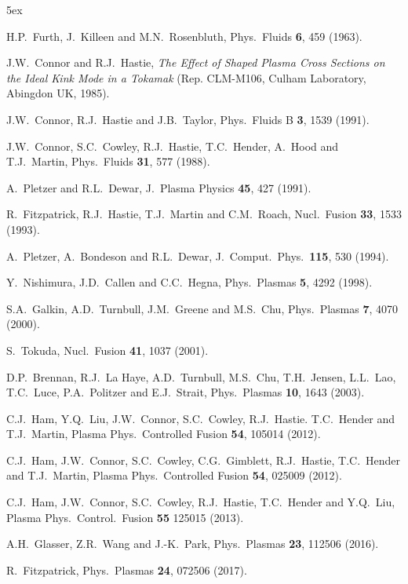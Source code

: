 \documentclass[12pt,prb,aps]{revtex4-1}
\begin{document}
\begin{thebibliography}{99}\baselineskip 5ex

 H.P.~Furth,  J.~Killeen and M.N.~Rosenbluth,  Phys.\ Fluids {\bf 6}, 459 (1963).

 J.W.~Connor and R.J.~Hastie, {\em The Effect of Shaped Plasma Cross Sections on the Ideal Kink Mode in a Tokamak}\/ (Rep. CLM-M106, Culham Laboratory, Abingdon UK, 1985).

 J.W.~Connor, R.J.~Hastie and J.B.~Taylor, Phys.\ Fluids B {\bf 3}, 1539 (1991).

 J.W.~Connor,  S.C.~Cowley, R.J.~Hastie,  T.C.~Hender,  A.~Hood  and T.J.~Martin,  Phys.\ Fluids {\bf 31}, 577 (1988).

 A.~Pletzer and R.L.~Dewar, J.\ Plasma Physics {\bf 45}, 427 (1991).

 R.~Fitzpatrick, R.J.~Hastie, T.J.~Martin and C.M.~Roach, Nucl.\ Fusion {\bf 33}, 1533 (1993).

  A.~Pletzer, A.~Bondeson and R.L.~Dewar, J.\ Comput.\ Phys.\ {\bf 115}, 530 (1994).

 Y.~Nishimura, J.D.~Callen and C.C.~Hegna, Phys.\ Plasmas {\bf 5}, 4292 (1998).

 S.A.~Galkin, A.D.~Turnbull, J.M.~Greene and M.S.~Chu, Phys.\ Plasmas {\bf 7}, 4070 (2000). 

 S.~Tokuda, Nucl.\ Fusion {\bf 41}, 1037 (2001).

 D.P.~Brennan, R.J.~La Haye, A.D.~Turnbull, M.S.~Chu, T.H.~Jensen, L.L.~Lao, T.C.~Luce, P.A.~Politzer and E.J.~Strait, Phys.\ Plasmas {\bf 10}, 1643 (2003).

  C.J.~Ham, Y.Q.~Liu, J.W.~Connor, S.C.~Cowley, R.J.~Hastie. T.C.~Hender and T.J.~Martin, Plasma Phys.\ Controlled Fusion {\bf 54}, 105014 (2012). 

 C.J.~Ham, J.W.~Connor, S.C.~Cowley, C.G.~Gimblett, R.J.~Hastie, T.C.~Hender and T.J.~Martin, Plasma Phys.\ Controlled Fusion {\bf 54}, 025009 (2012). 

 C.J.~Ham, J.W.~Connor, S.C.~Cowley, R.J.~Hastie, T.C.~Hender and Y.Q.~Liu, Plasma Phys.\ Control.\ Fusion {\bf 55} 125015 (2013).

 A.H.~Glasser, Z.R.~Wang and J.-K.~Park, Phys.\ Plasmas {\bf 23}, 112506 (2016).

 R.~Fitzpatrick, Phys.\ Plasmas {\bf 24}, 072506 (2017). 


\end{thebibliography}
\end{document}
